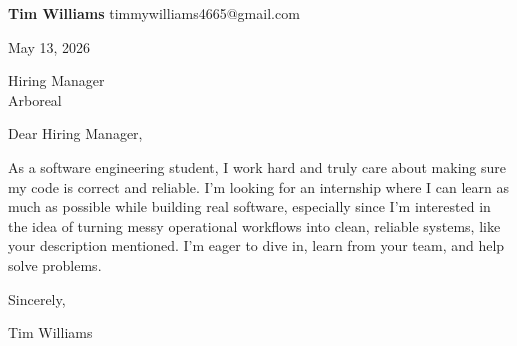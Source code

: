 \documentclass[12pt]{article}
\begin{document}
\textbf{Tim Williams} \hfill timmywilliams4665@gmail.com

\vspace{1em}

May 13, 2026

\vspace{1em}

Hiring Manager \\
Arboreal

\vspace{1em}

Dear Hiring Manager,

As a software engineering student, I work hard and truly care about making sure my code is correct and reliable. I'm looking for an internship where I can learn as much as possible while building real software, especially since I'm interested in the idea of turning messy operational workflows into clean, reliable systems, like your description mentioned. I'm eager to dive in, learn from your team, and help solve problems.

\vspace{1em}

Sincerely,

\vspace{2em}

Tim Williams
\end{document}
